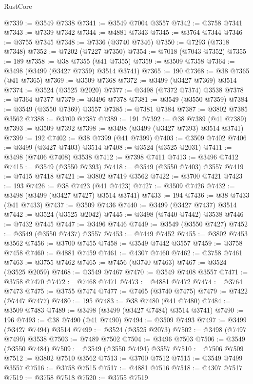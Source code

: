 \begin{lexlean}{RustCore}
\begin{coremodule}
@7339 := @3549 @7338
@7341 := @3549 @7004 @3557
@7342 := @3758 @7341
@7343 := @7339 @7342
@7344 := @4881 @7343
@7345 := @3764 @7344
@7346 := @3755 @7345
@7348 := @7336 (@3740 @7346)
@7350 := @7293 (@7318 @7348)
@7352 := @7202 (@7227 @7350)
@7354 := @7018 (@7043 @7352)
@7355 := 189
@7358 := @38 @7355 (@41 @7355)
@7359 := @3509 @7358
@7364 := @3498 (@3499 (@3427 @7359) @3514 @3741)
@7365 := 190
@7368 := @38 @7365 (@41 @7365)
@7369 := @3509 @7368
@7372 := @3499 (@3427 @7369) @3514
@7374 := @3524 (@3525 @2020)
@7377 := @3498 (@7372 @7374) @3538
@7378 := @7364 @7377
@7379 := @3496 @7378
@7381 := @3549 (@3550 @7359)
@7384 := @3549 (@3550 @7369) @3557
@7385 := @7381 @7384
@7387 := @3802 @7385 @3562
@7388 := @3700 @7387
@7389 := 191
@7392 := @38 @7389 (@41 @7389)
@7393 := @3509 @7392
@7398 := @3498 (@3499 (@3427 @7393) @3514 @3741)
@7399 := 192
@7402 := @38 @7399 (@41 @7399)
@7403 := @3509 @7402
@7406 := @3499 (@3427 @7403) @3514
@7408 := @3524 (@3525 @2031)
@7411 := @3498 (@7406 @7408) @3538
@7412 := @7398 @7411
@7413 := @3496 @7412
@7415 := @3549 (@3550 @7393)
@7418 := @3549 (@3550 @7403) @3557
@7419 := @7415 @7418
@7421 := @3802 @7419 @3562
@7422 := @3700 @7421
@7423 := 193
@7426 := @38 @7423 (@41 @7423)
@7427 := @3509 @7426
@7432 := @3498 (@3499 (@3427 @7427) @3514 @3741)
@7433 := 194
@7436 := @38 @7433 (@41 @7433)
@7437 := @3509 @7436
@7440 := @3499 (@3427 @7437) @3514
@7442 := @3524 (@3525 @2042)
@7445 := @3498 (@7440 @7442) @3538
@7446 := @7432 @7445
@7447 := @3496 @7446
@7449 := @3549 (@3550 @7427)
@7452 := @3549 (@3550 @7437) @3557
@7453 := @7449 @7452
@7455 := @3802 @7453 @3562
@7456 := @3700 @7455
@7458 := @3549 @7442 @3557
@7459 := @3758 @7458
@7460 := @4881 @7459
@7461 := @4307 @7460
@7462 := @3758 @7461
@7463 := @3755 @7462
@7465 := @7456 (@3740 @7463)
@7467 := @3524 (@3525 @2059)
@7468 := @3549 @7467
@7470 := @3549 @7408 @3557
@7471 := @3758 @7470
@7472 := @7468 @7471
@7473 := @4881 @7472
@7474 := @3764 @7473
@7475 := @3755 @7474
@7477 := @7465 (@3740 @7475)
@7479 := @7422 (@7447 @7477)
@7480 := 195
@7483 := @38 @7480 (@41 @7480)
@7484 := @3509 @7483
@7489 := @3498 (@3499 (@3427 @7484) @3514 @3741)
@7490 := 196
@7493 := @38 @7490 (@41 @7490)
@7494 := @3509 @7493
@7497 := @3499 (@3427 @7494) @3514
@7499 := @3524 (@3525 @2073)
@7502 := @3498 (@7497 @7499) @3538
@7503 := @7489 @7502
@7504 := @3496 @7503
@7506 := @3549 (@3550 @7484)
@7509 := @3549 (@3550 @7494) @3557
@7510 := @7506 @7509
@7512 := @3802 @7510 @3562
@7513 := @3700 @7512
@7515 := @3549 @7499 @3557
@7516 := @3758 @7515
@7517 := @4881 @7516
@7518 := @4307 @7517
@7519 := @3758 @7518
@7520 := @3755 @7519

\end{coremodule}
\end{lexlean}
